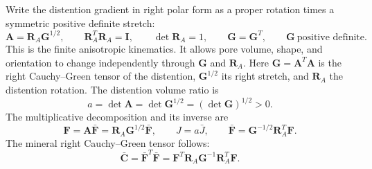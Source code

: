 Write the distention gradient in right polar form as a proper rotation
times a symmetric positive definite stretch:
\begin{equation}
 \mathbf A=\mathbf R_A\mathbf G^{1/2},\qquad
 \mathbf R_A^T\mathbf R_A=\mathbf I,\qquad \det\mathbf R_A=1,\qquad
 \mathbf G=\mathbf G^T,\qquad \mathbf G\ \text{positive definite}.
 \label{eq:fabric-distention-polar}
\end{equation}
This is the finite anisotropic kinematics. It allows pore volume, shape, and
orientation to change independently through \(\mathbf G\) and
\(\mathbf R_A\).
Here \(\mathbf G=\mathbf A^T\mathbf A\) is the right Cauchy--Green tensor
of the distention, \(\mathbf G^{1/2}\) its right stretch, and
\(\mathbf R_A\) the distention rotation. The distention volume ratio is
\begin{equation}
 a=\det\mathbf A=\det\mathbf G^{1/2}=(\det\mathbf G)^{1/2}>0.
 \label{eq:fabric-volume-ratio}
\end{equation}
The multiplicative decomposition and its inverse are
\begin{equation}
 \mathbf F=\mathbf A\bar{\mathbf F}
        =\mathbf R_A\mathbf G^{1/2}\bar{\mathbf F},\qquad
 J=a\bar J,\qquad
 \bar{\mathbf F}=\mathbf G^{-1/2}\mathbf R_A^T\mathbf F.
 \label{eq:fabric-multiplicative}
\end{equation}
The mineral right Cauchy--Green tensor follows:
\begin{equation}
 \bar{\mathbf C}=\bar{\mathbf F}^T\bar{\mathbf F}
   =\mathbf F^T\mathbf R_A\mathbf G^{-1}\mathbf R_A^T\mathbf F.
 \label{eq:fabric-mineral-metric}
\end{equation}

